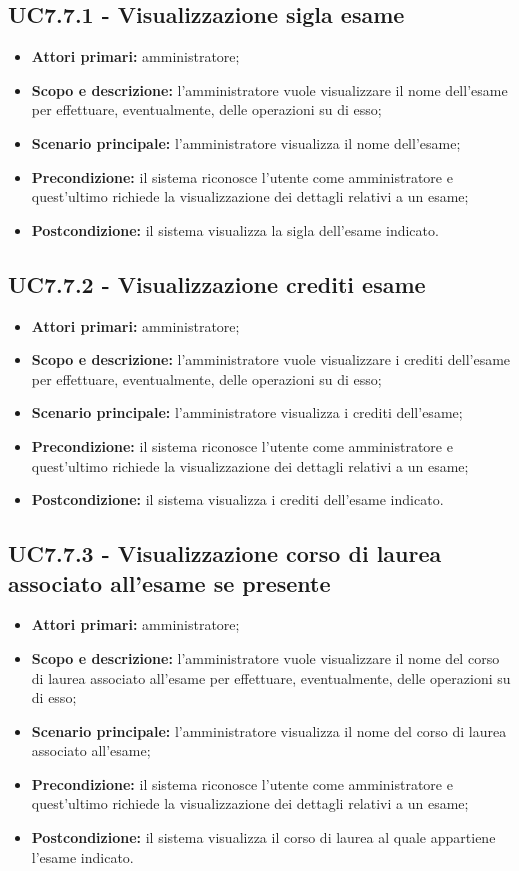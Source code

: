 \documentclass[AnalisiDeiRequisiti.tex]{subfiles}
\begin{document}
\subsection{UC7.7.1 - Visualizzazione sigla esame}
\begin{itemize}
	\item \textbf{Attori primari:} amministratore;
	\item \textbf{Scopo e descrizione:} l'amministratore vuole visualizzare il nome dell'esame per effettuare, eventualmente, delle operazioni su di esso;
	\item \textbf{Scenario principale:} l'amministratore visualizza il nome dell'esame;
	\item \textbf{Precondizione:} il sistema riconosce l'utente come amministratore e quest'ultimo richiede la visualizzazione dei dettagli relativi a un esame; 
	\item \textbf{Postcondizione:} il sistema visualizza la sigla dell'esame indicato.
\end{itemize}
\subsection{UC7.7.2 - Visualizzazione crediti esame}
\begin{itemize}
	\item \textbf{Attori primari:} amministratore;
	\item \textbf{Scopo e descrizione:} l'amministratore vuole visualizzare i crediti dell'esame per effettuare, eventualmente, delle operazioni su di esso;
	\item \textbf{Scenario principale:} l'amministratore visualizza i crediti dell'esame;
	\item \textbf{Precondizione:} il sistema riconosce l'utente come amministratore e quest'ultimo richiede la visualizzazione dei dettagli relativi a un esame; 
	\item \textbf{Postcondizione:} il sistema visualizza i crediti dell'esame indicato.
\end{itemize}
\subsection{UC7.7.3 - Visualizzazione corso di laurea associato all'esame se presente}
\begin{itemize}
	\item \textbf{Attori primari:} amministratore;
	\item \textbf{Scopo e descrizione:} l'amministratore vuole visualizzare il nome del corso di laurea associato all'esame per effettuare, eventualmente, delle operazioni su di esso;
	\item \textbf{Scenario principale:} l'amministratore visualizza il nome del corso di laurea associato all'esame;
	\item \textbf{Precondizione:} il sistema riconosce l'utente come amministratore e quest'ultimo richiede la visualizzazione dei dettagli relativi a un esame; 
	\item \textbf{Postcondizione:} il sistema visualizza il corso di laurea al quale appartiene l'esame indicato.
\end{itemize}
\end{document}
